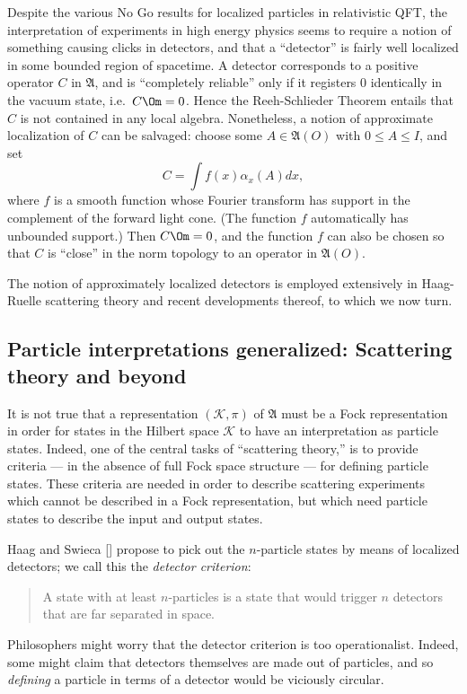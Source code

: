 \documentclass[11pt]{article}
\theoremstyle{definition}
\theoremstyle{definition}
\theoremstyle{remark}
\def\2#1{{\mathcal #1}}
\def\al#1{{\mathfrak #1}}
\def\a{\alpha} \def\b{\beta} \def\g{\gamma} \def\d{\delta}
\begin{document}
Despite the various No Go results for localized
particles in relativistic QFT, the interpretation of
experiments in high energy physics seems to require a
notion of something causing clicks in detectors, and
that a ``detector'' is fairly well localized in some
bounded region of spacetime.  A detector corresponds to
a positive operator $C$ in $\al A$, and is ``completely
reliable'' only if it registers $0$ identically in the
vacuum state, i.e.\ $C\Om =0$.  Hence the
Reeh-Schlieder Theorem entails that $C$ is not
contained in any local algebra.  Nonetheless, a notion
of approximate localization of $C$ can be salvaged:
choose some $A\in \al A (O)$ with $0\leq A\leq I$, and
set
$$ C =\int f(x)\a _x(A) dx ,$$
where $f$ is a smooth function whose Fourier transform has support in
the complement of the forward light cone.  (The function $f$
automatically has unbounded support.)  Then $C\Om =0$, and the
function $f$ can also be chosen so that $C$ is ``close'' in the norm
topology to an operator in $\al A(O)$.

The notion of approximately localized detectors is employed
extensively in Haag-Ruelle scattering theory and recent developments
thereof, to which we now turn.

\subsection{Particle interpretations generalized: Scattering theory
  and beyond} \label{scat}

It is not true that a representation $(\2K ,\pi )$ of $\al A$ must be
a Fock representation in order for states in the Hilbert space $\2K$
to have an interpretation as particle states.  Indeed, one of the
central tasks of ``scattering theory,'' is to provide criteria --- in
the absence of full Fock space structure --- for defining particle
states.  These criteria are needed in order to describe scattering
experiments which cannot be described in a Fock representation, but
which need particle states to describe the input and output states.

Haag and Swieca [\citeyear{haags}] propose to pick out the
$n$-particle states by means of localized detectors; we call this the
\emph{detector criterion}:
\begin{quote} A state with at least $n$-particles is a state that
  would trigger $n$ detectors that are far separated in space.
\end{quote} 
Philosophers might worry that the detector criterion is too
operationalist.  Indeed, some might claim that detectors themselves
are made out of particles, and so \emph{defining} a particle in terms
of a detector would be viciously circular.
\end{document}
